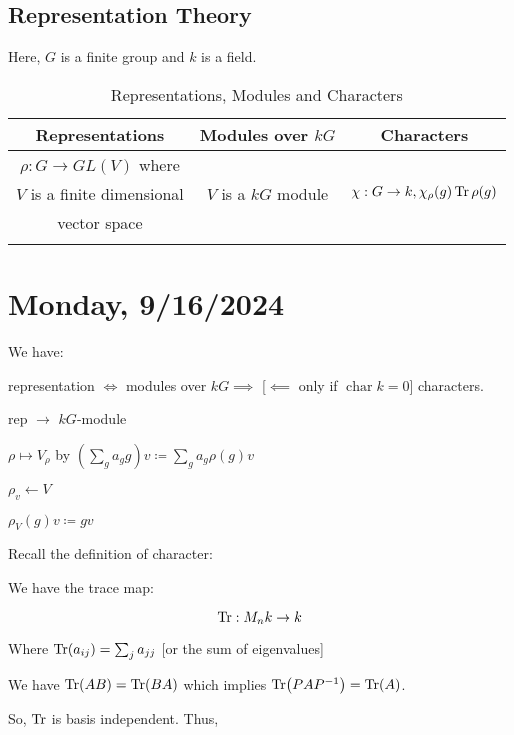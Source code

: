 \documentclass{article}
\theoremstyle{definition}
\newcommand{\Char}{\operatorname{char}}
\begin{document}
\subsection*{Representation Theory}

Here, \(G\) is a finite group and \(k\) is a field.

\begin{table}[H]
    \centering
    \begin{tabular}{c|c|c}
        \toprule
            Representations & Modules over \(k G\) &  Characters \\
        \midrule
            \(\rho : G \to GL(V)\) where  &  &   \\
            \(V\) is a finite dimensional & \(V\) is a \(kG\) module &  \(\chi : G \to k, \chi_{\rho}(g) \Tr \rho (g)\) \\
            vector space &  &   \\
             &  &   \\
        \bottomrule
    \end{tabular}
    \caption{Representations, Modules and Characters}
    \label{tab:reptable}
\end{table}


\section*{Monday, 9/16/2024}

We have:

\begin{center}
    representation \(\iff\) modules over \(kG \implies\) [\(\impliedby\) only if \(\Char k = 0\)] characters.
\end{center}

rep \(\to\) \(kG\)-module 

\(\rho \mapsto V_\rho\) by \((\sum_{g} a_g g)v \coloneqq \sum_{g} a_g \rho (g) v\) 

\(\rho_v \leftarrow V\)

\(\rho_V(g)v \coloneqq gv\) 

Recall the definition of character:

We have the trace map:

\[
    \Tr: M_n k \to k
\]

Where \(\Tr(a_{ij})=\sum_{j} a_{j j}\) [or the sum of eigenvalues]

We have \(\Tr(AB)=\Tr(BA)\) which implies \(\Tr(P A P ^{-1}) =\Tr(A)\). 

So, \(\Tr\) is basis independent. Thus,
\end{document}
